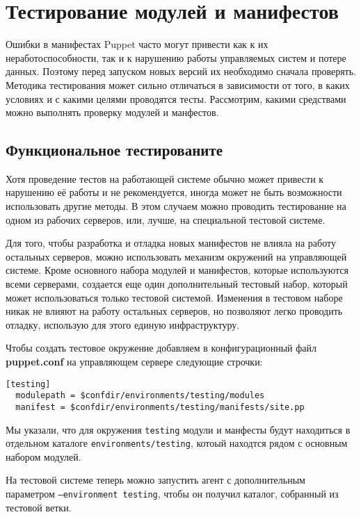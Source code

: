\chapter{Тестирование модулей и манифестов}

Ошибки в манифестах Puppet часто могут привести как к их неработоспособности, так и к нарушению работы управляемых систем и потере данных. Поэтому перед запуском новых версий их необходимо сначала проверять. Методика тестирования может сильно отличаться в зависимости от того, в каких условиях и с какими целями проводятся тесты. Рассмотрим, какими средствами можно выполнять проверку модулей и манфестов.

\section{Функциональное тестированите}

Хотя проведение тестов на работающей системе обычно может привести к нарушению её работы и не рекомендуется, иногда может не быть возможности использовать другие методы. В этом случаем можно проводить тестирование на одном из рабочих серверов, или, лучше, на специальной тестовой системе.

Для того, чтобы разработка и отладка новых манифестов не влияла на работу остальных серверов, можно использовать механизм окружений на управляющей системе. Кроме основного набора модулей и манифестов, которые используются всеми серверами, создается еще один дополнительный тестовый набор, который может использоваться только тестовой системой. Изменения в тестовом наборе никак не влияют на работу остальных серверов, но позволяют легко проводить отладку, использую для этого единую инфраструктуру.

Чтобы создать тестовое окружение добавляем в конфигурационный файл \textbf{puppet.conf} на управляющем сервере следующие строчки:

\begin{verbatim}
[testing]
  modulepath = $confdir/environments/testing/modules
  manifest = $confdir/environments/testing/manifests/site.pp
\end{verbatim}

Мы указали, что для окружения \texttt{testing} модули и манфесты будут находиться в отдельном каталоге \texttt{environments/testing}, котоый находтся рядом с основным набором модулей.

На тестовой системе теперь можно запустить агент с дополнительным параметром \texttt{--environment testing}, чтобы он получил каталог, собранный из тестовой ветки.

